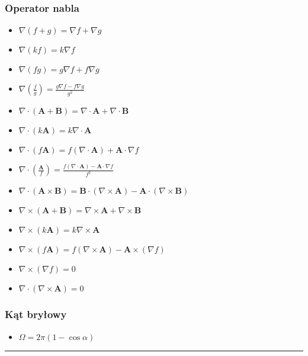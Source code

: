 \documentclass[../main.tex]{subfiles}
\begin{document}
\begin{multicols}{2}
\subsubsection*{Operator nabla}
\begin{itemize}
    \item \(\nabla(f+g)=\nabla f+\nabla g\)
    \item \(\nabla(kf)=k\nabla f\)
    \item \(\nabla(fg)=g\nabla f+f\nabla g\)
    \item \(\nabla(\frac{f}{g})=\frac{g\nabla f-f\nabla g}{g^2}\)
    \item \(\nabla\cdot(\mathbf{A}+\mathbf{B})=\nabla\cdot\mathbf{A}+\nabla\cdot\mathbf{B}\)
    \item \(\nabla\cdot(k\mathbf{A})=k\nabla\cdot\mathbf{A}\)
    \item \(\nabla\cdot (f\mathbf{A})=f(\nabla\cdot\mathbf{A})+\mathbf{A}\cdot\nabla f\)
    \item \(\nabla\cdot(\frac{\mathbf{A}}{f})=\frac{f(\nabla\cdot\mathbf{A})-\mathbf{A}\cdot\nabla
    f}{f^2}\)
    \item
    \(\nabla\cdot(\mathbf{A}\times\mathbf{B})=\mathbf{B}\cdot(\nabla\times\mathbf{A})-\mathbf{A}\cdot(\nabla\times\mathbf{B})\)
    \item \(\nabla\times(\mathbf{A}+\mathbf{B})=\nabla\times\mathbf{A}+\nabla\times\mathbf{B}\)
    \item \(\nabla\times(k\mathbf{A})=k\nabla\times\mathbf{A}\)
    \item \(\nabla\times(f\mathbf{A})=f(\nabla\times\mathbf{A})-\mathbf{A}\times(\nabla f)\)
    \item \(\nabla\times(\nabla f)=0\)
    \item \(\nabla\cdot(\nabla\times \mathbf{A})=0\)
\end{itemize}
\subsubsection*{Kąt bryłowy}
\begin{itemize}
    \item \(\Omega=2\pi(1-\cos\alpha)\)
\end{itemize}
\end{multicols}
\noindent\rule{\textwidth}{.5pt}
\end{document}
